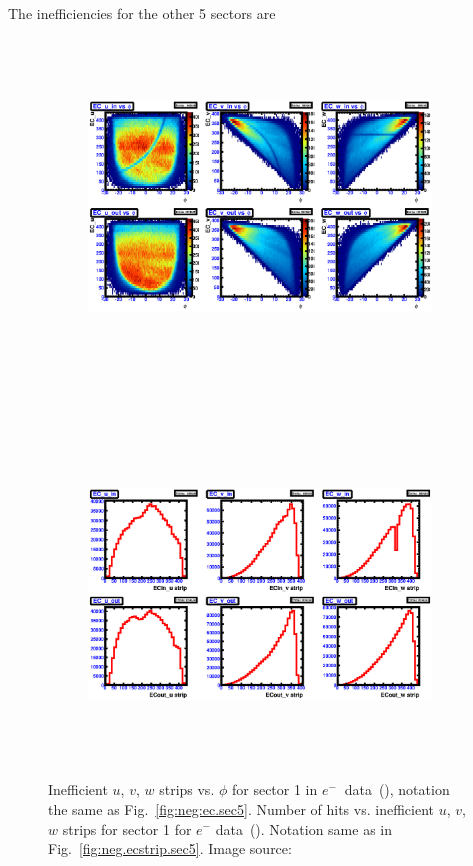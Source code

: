 \FloatBarrier
The inefficiencies for the other 5 sectors are  
\begin{figure}[!ht]
  \centering
  \begin{subfigure}[b]{\figwidth}
  \includegraphics[width=\figwidth, height=3.5in,valign=c]{figures/calib/ec/pim_ecuvw_phi_NOKnockout_sec1.eps}\caption{}\label{fig:EC_I_I} 
  \end{subfigure}%
  \\
  \begin{subfigure}[b]{\figwidth}
  \includegraphics[width=\figwidth, height=3.5in,valign=c]{figures/calib/ec/pim_ecuvw_NOKnockout_sec1.eps}\caption{}\label{fig:EC_II_I} 
  \end{subfigure}%
      \caption {Inefficient  $u$, $v$, $w$ strips vs. $\phi$ for sector 1 in  $e^{-} \ $ data~(), notation the same as Fig.~\ref{fig:neg:ec.sec5}. Number of hits vs. inefficient  $u$, $v$, $w$ strips for sector 1 for $e^-$ data~(). Notation same as in Fig.~\ref{fig:neg.ecstrip.sec5}. Image source:~\cite{clas.thesis.kunkel}}
        \label{fig:EC_no_I}
\end{figure}



